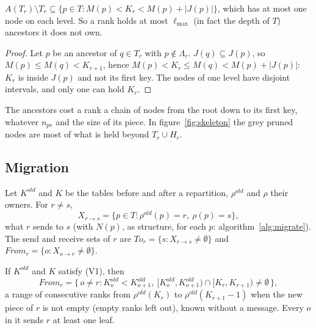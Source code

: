 \begin{proposition}
  \label{prop:anc}
  $A(T_r) \setminus T_r \subseteq \{p \in T : M(p) < K_r < M(p) +
  |J(p)|\}$, which has at most one node on each level. So a rank holds at
  most $\ell_{\max}$ (in fact the depth of $T$) ancestors it does not own.
\end{proposition}

\begin{proof}
  Let $p$ be an ancestor of $q \in T_r$ with $p \notin \Lambda_r$. $J(q)
  \subseteq J(p)$, so $M(p) \le M(q) < K_{r+1}$, hence $M(p) < K_r \le M(q)
  < M(p) + |J(p)|$: $K_r$ is inside $J(p)$ and not its first key. The nodes
  of one level have disjoint intervals, and only one can hold $K_r$.
\end{proof}

The ancestors cost a rank a chain of nodes from the root down to its first
key, whatever $n_{pe}$ and the size of its piece. In
figure~\ref{fig:skeleton} the grey pruned nodes are most of what is held
beyond $T_r \cup H_r$.

\subsection{Migration}

\begin{definition}
  Let $K^{old}$ and $K$ be the tables before and after a repartition,
  $\rho^{old}$ and $\rho$ their owners. For $r \ne s$,
  \[
    X_{r \to s} = \{p \in T : \rho^{old}(p) = r,\ \rho(p) = s\},
  \]
  what $r$ sends to $s$ (with $N(p)$, as structure, for each $p$:
  algorithm~\ref{alg:migrate}). The send and receive sets of $r$ are
  $\mathit{To}_r = \{s : X_{r \to s} \ne \emptyset\}$ and
  $\mathit{From}_r = \{o : X_{o \to r} \ne \emptyset\}$.
\end{definition}

\begin{proposition}
  \label{prop:from}
  If $K^{old}$ and $K$ satisfy (V1), then
  \[
    \mathit{From}_r = \{\, o \ne r : K^{old}_o < K^{old}_{o+1},\
      [K^{old}_o, K^{old}_{o+1}) \cap [K_r, K_{r+1}) \ne \emptyset \,\},
  \]
  a range of consecutive ranks from $\rho^{old}(K_r)$ to
  $\rho^{old}(K_{r+1} - 1)$ when the new piece of $r$ is not empty (empty
  ranks left out), known without a message.
  Every $o$ in it sends $r$ at least one leaf.
\end{proposition}

